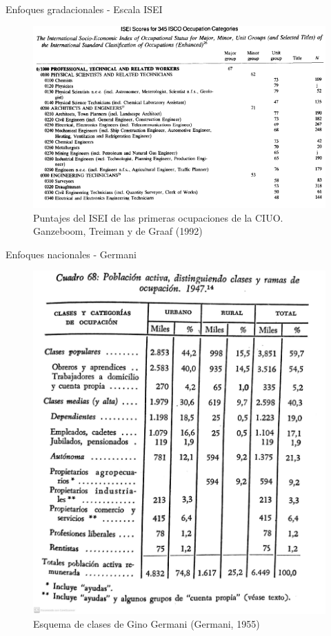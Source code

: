 \documentclass[
  spanish,
  ignorenonframetext,
]{beamer}
\begin{document}
\begin{frame}{Enfoques gradacionales - Escala ISEI}
\protect\hypertarget{enfoques-gradacionales---escala-isei}{}
\begin{figure}

{\centering \includegraphics[width=0.85\linewidth]{imagenes/isei} 

}

\caption{Puntajes del ISEI de las primeras ocupaciones de la CIUO. Ganzeboom, Treiman y de Graaf (1992)}\label{fig:unnamed-chunk-4}
\end{figure}
\end{frame}

\begin{frame}{Enfoques nacionales - Germani}
\protect\hypertarget{enfoques-nacionales---germani}{}
\begin{figure}

{\centering \includegraphics[width=0.5\linewidth]{imagenes/germani} 

}

\caption{Esquema de clases de Gino Germani (Germani, 1955)}\label{fig:unnamed-chunk-5}
\end{figure}
\end{frame}
\end{document}

